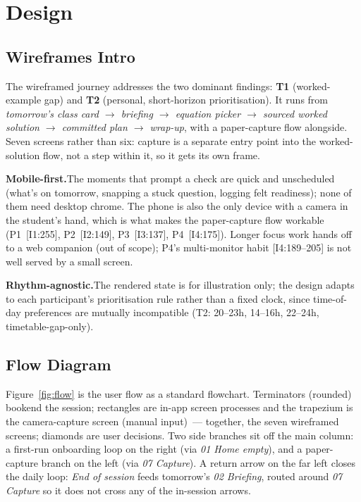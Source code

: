 \documentclass[a4paper,11pt]{article}
\begin{document}
\newpage
\section{Design}

\subsection{Wireframes Intro}\label{sec:wireframes-intro}

The wireframed journey addresses the two dominant findings:
\textbf{T1} (worked-example gap) and \textbf{T2} (personal,
short-horizon prioritisation). It runs from \emph{tomorrow's class
card $\rightarrow$ briefing $\rightarrow$ equation picker
$\rightarrow$ sourced worked solution $\rightarrow$ committed plan
$\rightarrow$ wrap-up}, with a paper-capture flow alongside. Seven
screens rather than six: capture is a separate entry point into the
worked-solution flow, not a step within it, so it gets its own
frame.

\textbf{Mobile-first.}\quad The moments that prompt a check are
quick and unscheduled (what's on tomorrow, snapping a stuck
question, logging felt readiness); none of them need desktop
chrome. The phone is also the only device with a camera in the
student's hand, which is what makes the paper-capture flow workable
(P1~[I1:255], P2~[I2:149], P3~[I3:137], P4~[I4:175]). Longer
focus work hands off to a web companion (out of scope); P4's
multi-monitor habit \mbox{[I4:189--205]} is not well served by a
small screen.

\textbf{Rhythm-agnostic.}\quad The rendered state is for
illustration only; the design adapts to each participant's
prioritisation rule rather than a fixed clock, since time-of-day
preferences are mutually incompatible (T2: 20--23h, 14--16h,
22--24h, timetable-gap-only).

\clearpage
\subsection{Flow Diagram}\label{sec:flow}

Figure~\ref{fig:flow} is the user flow as a standard
flowchart. Terminators (rounded) bookend the session; rectangles are
in-app screen processes and the trapezium is the camera-capture
screen (manual input)~--- together, the seven wireframed screens;
diamonds are user decisions. Two side branches sit off the main
column: a first-run onboarding loop on the right (via \emph{01 Home
empty}), and a paper-capture branch on the left (via \emph{07
Capture}). A return arrow on the far left closes the daily loop:
\emph{End of session} feeds tomorrow's \emph{02 Briefing}, routed
around \emph{07 Capture} so it does not cross any of the in-session
arrows.
\end{document}
